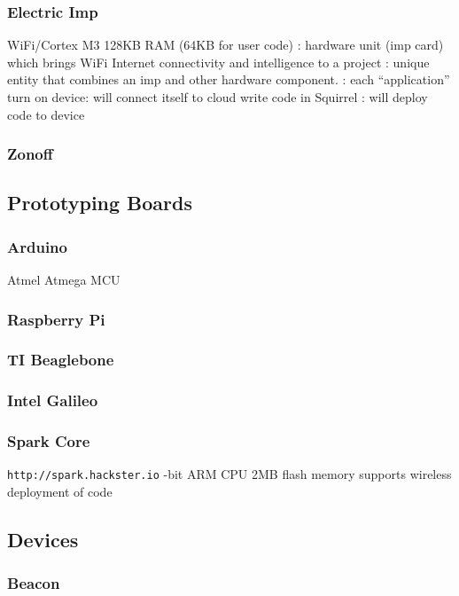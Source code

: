 \documentclass{myproc}
\begin{document}
\subsubsection{\textcolor{red2}{\bf{}Electric Imp}}
\bit
\w WiFi/Cortex M3
\w 128KB RAM (64KB for user code)
\w {}
  \bit
  \w {}: hardware unit (imp card) which brings WiFi Internet
  connectivity and intelligence to a project
  \w {}: unique entity that combines an imp and other hardware
  component. 
  \eit
\w {}
\w {}
   \bit
   \w {}: each ``application''
   \w turn on device: will connect itself to cloud
   \w write code in Squirrel
   \w {}: will deploy code to device
   \eit
\eit

\subsubsection{\textcolor{red2}{\bf{}Zonoff}}


\subsection{Prototyping Boards}
\subsubsection{Arduino}
\bit
\w Atmel Atmega MCU
\eit
\subsubsection{Raspberry Pi}
\subsubsection{TI Beaglebone}
\subsubsection{Intel Galileo}
\subsubsection{Spark Core}
\bit
\w \texttt{http://spark.hackster.io}
-bit ARM CPU
\w 2MB flash memory
\w supports wireless deployment of code
\eit

\subsection{Devices}
\subsubsection{\textcolor{red2}{\bf{}Beacon}}
\end{document}
